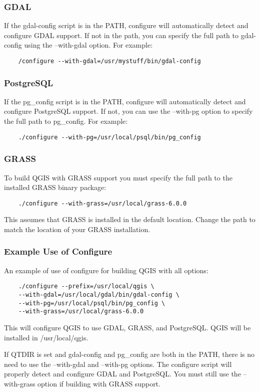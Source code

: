   \subsubsection{GDAL}
  If the gdal-config script is in the PATH, configure will automatically
  detect and configure GDAL support. If not in the path, you can specify
  the full path to gdal-config using the --with-gdal option. For example:
  \begin{verbatim}
    /configure --with-gdal=/usr/mystuff/bin/gdal-config
  \end{verbatim}
  \subsubsection{PostgreSQL}
  If the pg\_config script is in the PATH, configure will automatically
  detect and configure PostgreSQL support. If not, you can use the
  --with-pg option to specify the full path to pg\_config. For example:
  \begin{verbatim}
    ./configure --with-pg=/usr/local/psql/bin/pg_config
  \end{verbatim}
\subsubsection{GRASS}
To build QGIS with GRASS support you must specify the full path to the installed GRASS binary package:
\begin{verbatim}
    ./configure --with-grass=/usr/local/grass-6.0.0
\end{verbatim}
This assumes that GRASS is installed in the default location. Change the path to match the location of your GRASS installation.
  \subsubsection{Example Use of Configure}
  An example of use of configure for building QGIS with all options:
  \begin{verbatim}
    ./configure --prefix=/usr/local/qgis \
    --with-gdal=/usr/local/gdal/bin/gdal-config \
    --with-pg=/usr/local/psql/bin/pg_config \
    --with-grass=/usr/local/grass-6.0.0
  \end{verbatim}
  This will configure QGIS to use GDAL, GRASS, and PostgreSQL. QGIS will be
  installed in /usr/local/qgis.

  If QTDIR is set and gdal-config and pg\_config are both
  in the PATH, there is no need to use the --with-gdal and --with-pg
  options. The configure script will properly detect and configure
  GDAL and PostgreSQL. You must still use the --with-grass option if building with GRASS support.
